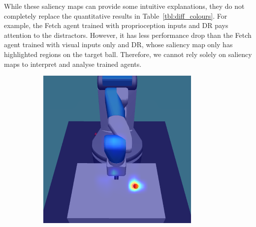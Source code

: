 While these saliency maps can provide some intuitive explanations, they do not completely replace the quantitative results in Table~\ref{tbl:diff_colours}. For example, the Fetch agent trained with proprioception inputs and DR pays attention to the distractors. However, it has less performance drop than the Fetch agent trained with visual inputs only and DR, whose saliency map only has highlighted regions on the target ball. Therefore, we cannot rely solely on saliency maps to interpret and analyse trained agents.

\begin{figure}[h!]
  \centering
  \begin{subfigure}{0.24\columnwidth}
    \includegraphics[width=\linewidth]{figures/chapter6/distractor_saliency_fetch_pro_off/standard_visual_std}
  \end{subfigure}
  \begin{subfigure}{0.24\columnwidth}

\end{subfigure}
\end{figure}
